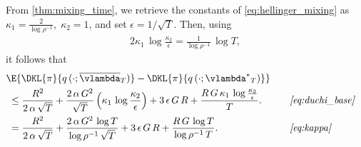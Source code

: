 \begin{proofEnd}
  From \cref{thm:mixing_time}, we retrieve the constants of \cref{eq:hellinger_mixing} as
  \(
  \kappa_1=\frac{2}{\log \rho^{-1} },\;  \kappa_2 = 1
  \), and set \(\epsilon = 1/\sqrt{T}\).
  Then, using
  \begin{alignat}{2}
    \kappa_1 \, \log \frac{\kappa_2}{\epsilon}
    =
    \frac{1}{\log \rho^{-1} } \, \log T,\label{eq:kappa}
  \end{alignat}
  it follows that
  \begin{alignat*}{2}
    &\E{ \DKL{\pi}{q\,(\cdot; {\overline{\vlambda}_{T}})} - \DKL{\pi}{q\left(\cdot; {\vlambda^*}_{T}\right)}}
    \\
    &\;\leq
    \frac{R^2}{2 \, \alpha \, \sqrt{T}}
    +
    \frac{2 \, \alpha \, G^2}{\sqrt{T}}\left( \kappa_1 \, \log \frac{\kappa_2}{\epsilon} \right)
    +
    3 \, \epsilon \, G \, R
    +
    \frac{R \, G \, \kappa_1 \, \log \frac{\kappa_2}{\epsilon}}{T}.
    \nonumber
    &&\quad\text{\textit{\cref{eq:duchi_base}}}
    \\
    &\;=
    \frac{R^2}{2 \, \alpha \, \sqrt{T}}
    +
    \frac{2 \, \alpha \, G^2 \, \log T }{\log \rho^{-1} \, \sqrt{T}}
    +
    3 \, \epsilon \, G \, R
    +
    \frac{R \, G \, \log T }{\log \rho^{-1} \, T}.
    \nonumber
    &&\quad\text{\textit{\cref{eq:kappa}}}
  \end{alignat*}
\end{proofEnd}

